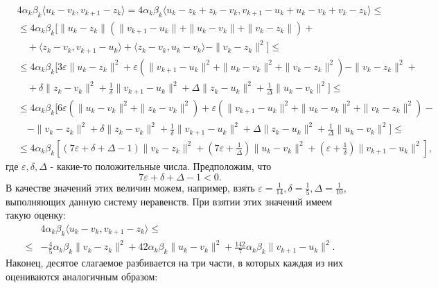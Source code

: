 \begin{equation*}
\begin{aligned}
&4\alpha_k\beta_k\langle u_k-v_k,v_{k+1}-z_k\rangle = 4\alpha_k\beta_k \langle u_k-z_k+z_k-v_k,v_{k+1}-u_k+u_k-v_k+v_k-z_k\rangle\leqslant\\
&\leqslant 4\alpha_k\beta_k \Big[ \|u_k-z_k\|\left( \|v_{k+1}-u_k\|+\|u_k-v_k\|+\|v_k-z_k\|\right)+\\
&\quad +\langle z_k-v_k,v_{k+1}-u_k\rangle+\langle z_k-v_k, u_k-v_k\rangle-\|v_k-z_k\|^2 \Big] \leqslant\\
&\leqslant 4\alpha_k\beta_k\Big[ 3\varepsilon \|u_k-z_k\|^2+\varepsilon\left(\|v_{k+1}-u_k\|^2+\|u_k-v_k\|^2+\|v_k-z_k\|^2 \right)-\|v_k-z_k\|^2+\\
&\quad+\delta\|z_k-v_k\|^2+\frac{1}{\delta}\|v_{k+1}-u_k\|^2+\Delta\|z_k-u_k\|^2+\frac{1}{\Delta}\|u_k-v_k\|^2\Big]\leqslant\\
&\leqslant 4\alpha_k\beta_k\Big[6\varepsilon \left(\|u_k-v_k\|^2+\|z_k-v_k\|^2\right)+\varepsilon\left(\|v_{k+1}-u_k\|^2+\|u_k-v_k\|^2+\|v_k-z_k\|^2\right)-\\
&\quad-\|v_k-z_k\|^2+\delta\|z_k-v_k\|^2+\frac{1}{\delta}\|v_{k+1}-u_k\|^2+\Delta\|z_k-u_k\|^2+\frac{1}{\Delta}\|u_k-v_k\|^2\Big]\leqslant\\
&\leqslant 4\alpha_k\beta_k\left[ (7\varepsilon +\delta+\Delta-1)\|v_k-z_k\|^2+(7\varepsilon+\frac{1}{\Delta})\|u_k-v_k\|^2+(\varepsilon+\frac{1}{\delta})\|v_{k+1}-u_k\|^2\right],
\end{aligned}
\end{equation*}
где $\varepsilon,\delta,\Delta$ - какие-то положительные числа. Предположим, что
\begin{equation*}
7\varepsilon +\delta+\Delta-1 <0.
\end{equation*}
В качестве значений этих величин можем, например, взять $\varepsilon = \frac{1}{14},\delta = \frac{1}{5},\Delta = \frac{1}{10}$, выполняющих данную систему неравенств. При взятии этих значений имеем такую оценку:
\begin{equation}
\label{[3]-47}
\begin{aligned}
&4\alpha_k\beta_k\langle u_k-v_k,v_{k+1}-z_k\rangle \leqslant\\
\leqslant &-\frac{4}{5}\alpha_k\beta_k\|v_k-z_k\|^2+42\alpha_k\beta_k\|u_k-v_k\|^2+\frac{142}{7}\alpha_k\beta_k\|v_{k+1}-u_k\|^2.
\end{aligned}
\end{equation}
Наконец, десятое слагаемое разбивается на три части, в которых каждая из них оцениваются аналогичным образом:
